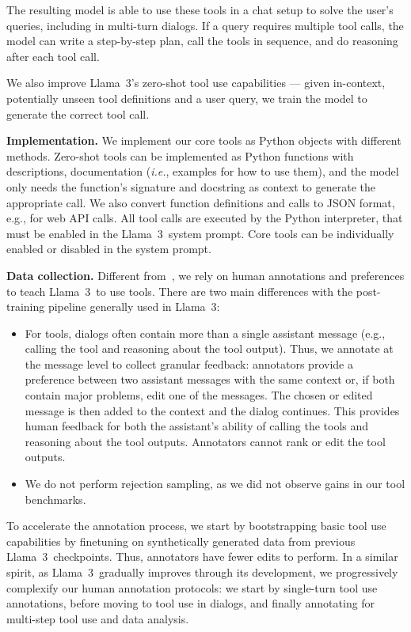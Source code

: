 The resulting model is able to use these tools in a chat setup to solve the user's queries, including in multi-turn dialogs. If a query requires multiple tool calls, the model can write a step-by-step plan, call the tools in sequence, and do reasoning after each tool call. 

We also improve Llama~3's zero-shot tool use capabilities --- given in-context, potentially unseen tool definitions and a user query, we train the model to generate the correct tool call. 

\textbf{Implementation.}
We implement our core tools as Python objects with different methods. Zero-shot tools can be implemented as Python functions with descriptions, documentation (\emph{i.e.}, examples for how to use them), and the model only needs the function's signature and docstring as context to generate the appropriate call. We also convert function definitions and calls to JSON format, e.g., for web API calls. All tool calls are executed by the Python interpreter, that must be enabled in the Llama~3~system prompt. Core tools can be individually enabled or disabled in the system prompt. 

\textbf{Data collection.} Different from~\citet{schick2024toolformer}, we rely on human annotations and preferences to teach Llama~3~to use tools. There are two main differences with the post-training pipeline generally used in Llama~3:

\begin{itemize}
    \item For tools, dialogs often contain more than a single assistant message (e.g., calling the tool and reasoning about the tool output). Thus, we annotate at the message level to collect granular feedback: annotators provide a preference between two assistant messages with the same context or, if both contain major problems, edit one of the messages. The chosen or edited message is then added to the context and the dialog continues. This provides human feedback for both the assistant's ability of calling the tools and reasoning about the tool outputs. Annotators cannot rank or edit the tool outputs. 
    \item We do not perform rejection sampling, as we did not observe gains in our tool benchmarks.
\end{itemize}

To accelerate the annotation process, we start by bootstrapping basic tool use capabilities by finetuning on synthetically generated data from previous Llama~3~checkpoints. Thus, annotators have fewer edits to perform. In a similar spirit, as Llama~3~gradually improves through its development, we progressively complexify our human annotation protocols: we start by single-turn tool use annotations, before moving to tool use in dialogs, and finally annotating for multi-step tool use and data analysis.

